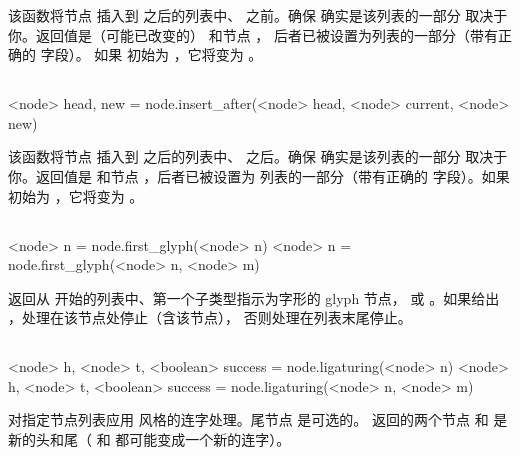 该函数将节点  插入到  之后的列表中、
 之前。确保  确实是该列表的一部分
取决于你。返回值是（可能已改变的） 和节点 ，
后者已被设置为列表的一部分（带有正确的  字段）。
如果  初始为 ，它将变为 。

\subsection{}


\begin{typing}
<node> head, new =
    node.insert_after(<node> head, <node> current, <node> new)
\end{typing}

该函数将节点  插入到  之后的列表中、
 之后。确保  确实是该列表的一部分
取决于你。返回值是  和节点 ，后者已被设置为
列表的一部分（带有正确的  字段）。如果 
初始为 ，它将变为 。

\subsection{}


\begin{typing}
<node> n =
    node.first_glyph(<node> n)
<node> n =
    node.first_glyph(<node> n, <node> m)
\end{typing}

返回从  开始的列表中、第一个子类型指示为字形的 glyph 节点，
或 。如果给出 ，处理在该节点处停止（含该节点），
否则处理在列表末尾停止。

\subsection{}


\begin{typing}
<node> h, <node> t, <boolean> success =
    node.ligaturing(<node> n)
<node> h, <node> t, <boolean> success =
    node.ligaturing(<node> n, <node> m)
\end{typing}

对指定节点列表应用 \TEX 风格的连字处理。尾节点  是可选的。
返回的两个节点  和  是新的头和尾（ 和
 都可能变成一个新的连字）。


